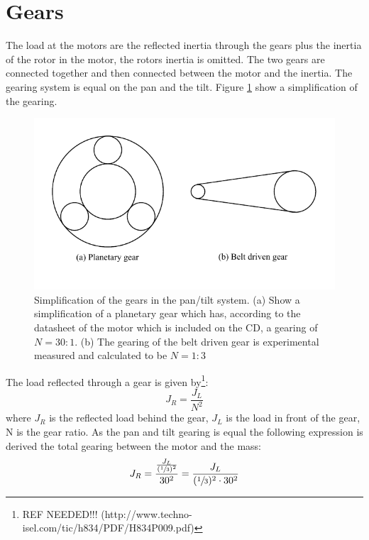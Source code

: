 \section{Gears}
The load at the motors are the reflected inertia through the gears plus the inertia of the rotor in the motor, the rotors inertia is omitted. The two gears are connected together and then connected between the motor and the inertia. The gearing system is equal on the pan and the tilt. Figure \ref{fig:app_gears} show a simplification of the gearing.
\begin{figure}[htb]
	\centering
	\includegraphics[scale=1,trim=0 0 0 0]{graphics/gears.pdf} %
	\caption{Simplification of the gears in the pan/tilt system. (a) Show a simplification of a planetary gear which has, according to the datasheet of the motor which is included on the CD, a gearing of $N = 30:1$. (b) The gearing of the belt driven gear is experimental measured and calculated to be $N = 1:3$}
	\label{fig:app_gears}			%
\end{figure}
The load reflected through a gear is given by\footnote{REF NEEDED!!!   (http://www.techno-isel.com/tic/h834/PDF/H834P009.pdf)}:
\begin{equation}
	J_R = \frac{J_L}{N^{2}}
\end{equation}
where $J_R$ is the reflected load behind the gear, $J_L$ is the load in front of the gear, N is the gear ratio. As the pan and tilt gearing is equal the following expression is derived the total gearing between the motor and the mass:
\begin{equation}
	J_R = \frac{\frac{J_L}{(\sfrac{1}{3})^{2}}}{30^{2}} = \frac{J_L}{(\sfrac{1}{3})^{2} \cdot 30^{2}}\label{app:eq_reflected_inertia_temp}
\end{equation}

